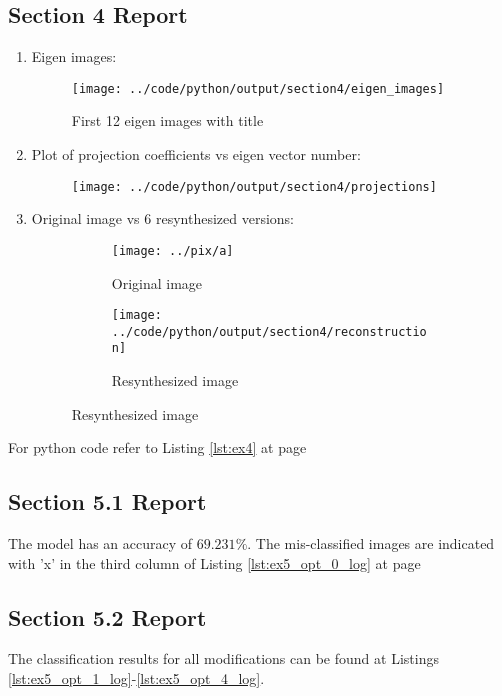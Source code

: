 \documentclass[a4paper,11pt]{article}
\newcommand{\reflst}[1]{Listing \ref{#1} at page \pageref{#1}}
\begin{document}
\subsection*{Section 4 Report} 
\begin{enumerate}
 \item Eigen images:
 \begin{figure}[!hp]
  \centering
  \texttt{[image: ../code/python/output/section4/eigen\_images]}
  \caption{First 12 eigen images with title}
 \end{figure}
 
 \clearpage
 \item Plot of projection coefficients vs eigen vector number:
 \begin{figure}[!hp]
  \centering
  \texttt{[image: ../code/python/output/section4/projections]}
 \end{figure}
 
 \clearpage
 \item Original image vs 6 resynthesized versions:
 \begin{figure}[!hp]
 \centering
 \begin{subfigure}{0.1\textwidth}
 \texttt{[image: ../pix/a]}
 \caption{Original image}
 \end{subfigure}
%  
 \begin{subfigure}{0.8\textwidth}
 \texttt{[image: ../code/python/output/section4/reconstruction]}
 \caption{Resynthesized image}
 \end{subfigure}
\end{figure} 

\end{enumerate}
For python code refer to \reflst{lst:ex4}


\clearpage
\vspace{2ex}
\subsection*{Section 5.1 Report} 
The model has an accuracy of $69.231\%$. The mis-classified images are indicated with 'x' in the third column of \reflst{lst:ex5_opt_0_log}


\clearpage
\vspace{2ex}
\subsection*{Section 5.2 Report} 
The classification results for all modifications can be found at Listings \ref{lst:ex5_opt_1_log}-\ref{lst:ex5_opt_4_log}.
\end{document}

